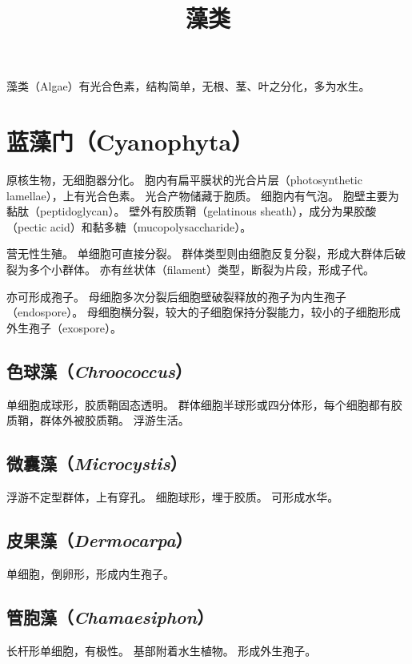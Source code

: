 \documentclass[11pt]{article}
\title{藻类}
\date{}
\begin{document}
  \maketitle

  \linenumbers
藻类（Algae）有光合色素，结构简单，无根、茎、叶之分化，多为水生。

\section{蓝藻门（Cyanophyta）}
原核生物，无细胞器分化。
胞内有扁平膜状的光合片层（photosynthetic lamellae），上有光合色素。
光合产物储藏于胞质。
细胞内有气泡。
胞壁主要为黏肽（peptidoglycan）。
壁外有胶质鞘（gelatinous sheath），成分为果胶酸（pectic acid）和黏多糖（mucopolysaccharide）。

\newline

营无性生殖。
单细胞可直接分裂。
群体类型则由细胞反复分裂，形成大群体后破裂为多个小群体。
亦有丝状体（filament）类型，断裂为片段，形成子代。

\newline

亦可形成孢子。
母细胞多次分裂后细胞壁破裂释放的孢子为内生孢子（endospore）。
母细胞横分裂，较大的子细胞保持分裂能力，较小的子细胞形成外生孢子（exospore）。

\subsection{色球藻（\textit{Chroococcus}）}
单细胞成球形，胶质鞘固态透明。
群体细胞半球形或四分体形，每个细胞都有胶质鞘，群体外被胶质鞘。
浮游生活。

\subsection{微囊藻（\textit{Microcystis}）}
浮游不定型群体，上有穿孔。
细胞球形，埋于胶质。
可形成水华。

\subsection{皮果藻（\textit{Dermocarpa}）}
单细胞，倒卵形，形成内生孢子。

\subsection{管胞藻（\textit{Chamaesiphon}）}
长杆形单细胞，有极性。
基部附着水生植物。
形成外生孢子。
\end{document}
